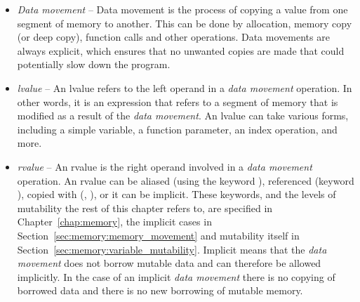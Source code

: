\begin{itemize}
  \setlength\itemsep{-4pt}
\item \textit{Data movement} -- Data movement is the process of copying a value
  from one segment of memory to another. This can be done by allocation, memory
  copy (or deep copy), function calls and other operations. Data movements are
  always explicit, which ensures that no unwanted copies are made that could
  potentially slow down the program.

\item \textit{lvalue} -- An lvalue refers to the left operand in a \textit{data
  movement} operation. In other words, it is an expression that refers to a
  segment of memory that is modified as a result of the \textit{data movement}.
  An lvalue can take various forms, including a simple variable, a function
  parameter, an index operation, and more.

\item \textit{rvalue} -- An rvalue is the right operand involved in a
  \textit{data movement} operation. An rvalue can be aliased (using the keyword
  ), referenced (keyword ), copied with
  (, ), or it can be implicit. These keywords, and the
  levels of mutability the rest of this chapter refers to, are specified in
  Chapter~\ref{chap:memory}, the implicit cases in
  Section~\ref{sec:memory:memory_movement} and mutability itself in
  Section~\ref{sec:memory:variable_mutability}. Implicit means that
  the \textit{data movement} does not borrow mutable data and can therefore be
  allowed implicitly. In the case of an implicit \textit{data movement} there is
  no copying of borrowed data and there is no new borrowing of mutable memory.

\end{itemize}






